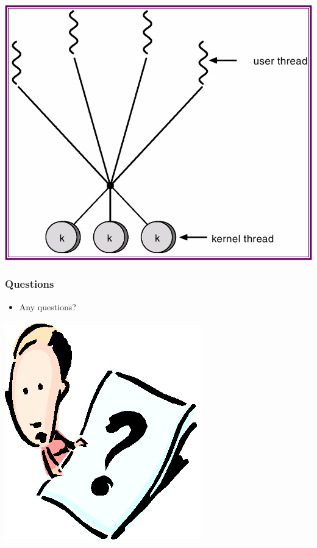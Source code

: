 \documentclass[CJKutf8,xcolor=pdftex,dvipsnames,table]{beamer}
\begin{document}
\begin{CJK*}{UTF8}{song}
\begin{frame}
\begin{minipage}[c]{0.5\textwidth}
\begin{center}
      \includegraphics[scale=0.4]{v6f5-4}
    \end{center}
  \end{minipage}
  \end{frame}

  \fi

  \begin{frame}
  \frametitle{Questions}
  \begin{itemize}
  \item{Any questions?}
  \end{itemize}
  \begin{center}
    \includegraphics[scale=.5]{question}
  \end{center}
  \end{frame}


\end{CJK*}
\end{document}
